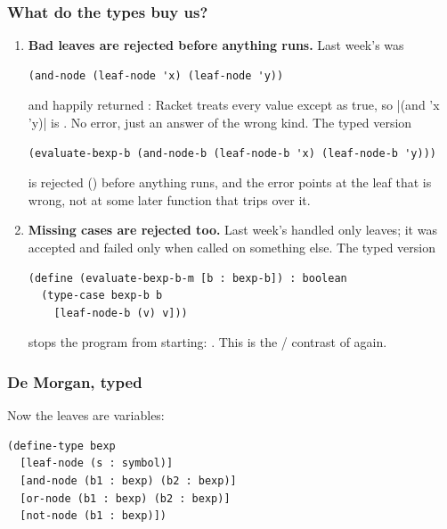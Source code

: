 \subsubsection{What do the types buy us?}
\begin{enumerate}[label=(\alph*)]
  \item \textbf{Bad leaves are rejected before anything runs.} Last week's  was
\begin{lstlisting}
(and-node (leaf-node 'x) (leaf-node 'y))
\end{lstlisting}
  and  happily returned : Racket treats every value except  as true, so \rkt|(and 'x 'y)| is . No error, just an answer of the wrong kind. The typed version
\begin{lstlisting}
(evaluate-bexp-b (and-node-b (leaf-node-b 'x) (leaf-node-b 'y)))
\end{lstlisting}
  is rejected () before anything runs, and the error points at the leaf that is wrong, not at some later function that trips over it.
  \item \textbf{Missing cases are rejected too.} Last week's  handled only leaves; it was accepted and failed only when called on something else. The typed version
\begin{lstlisting}
(define (evaluate-bexp-b-m [b : bexp-b]) : boolean
  (type-case bexp-b b
    [leaf-node-b (v) v]))
\end{lstlisting}
  stops the program from starting: . This is the / contrast of  again.
\end{enumerate}

\subsubsection{De Morgan, typed} Now the leaves are variables:
\begin{lstlisting}
(define-type bexp
  [leaf-node (s : symbol)]
  [and-node (b1 : bexp) (b2 : bexp)]
  [or-node (b1 : bexp) (b2 : bexp)]
  [not-node (b1 : bexp)])
\end{lstlisting}

